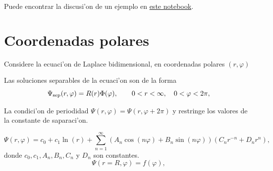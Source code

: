 Puede encontrar la discusi'on de un ejemplo en \href{https://github.com/gfrubi/FM2/blob/master/Notebooks/Ejemplo-MSV-Ecuacion-Onda-1D.ipynb}{este notebook}.
%
\section{Coordenadas polares}

Considere la ecuaci'on de Laplace bidimensional, en coordenadas polares $(r,\varphi)$


Las soluciones separables de la ecuaci'on son de la forma
\begin{equation}
\Psi_{\rm sep}(r,\varphi)=R(r)\Phi(\varphi), \qquad 0<r<\infty, \quad 0<\varphi<2\pi,
\end{equation}

La condici'on de periodidad $\Psi(r,\varphi)=\Psi(r,\varphi+2\pi)$ y restringe los valores de la constante de saparaci'on.

\begin{equation}
\Psi(r,\varphi)=c_0+c_1\ln(r)+\sum_{n=1}^\infty\left(A_n\cos(n\varphi)+B_n\sin(n\varphi)\right)
\left(C_nr^{-n}+D_nr^n\right),
\end{equation}
donde $c_0,c_1,A_n,B_n,C_n$ y $D_n$ son constantes.
\begin{equation}
\Psi(r=R,\varphi)=f(\varphi),
\end{equation}


